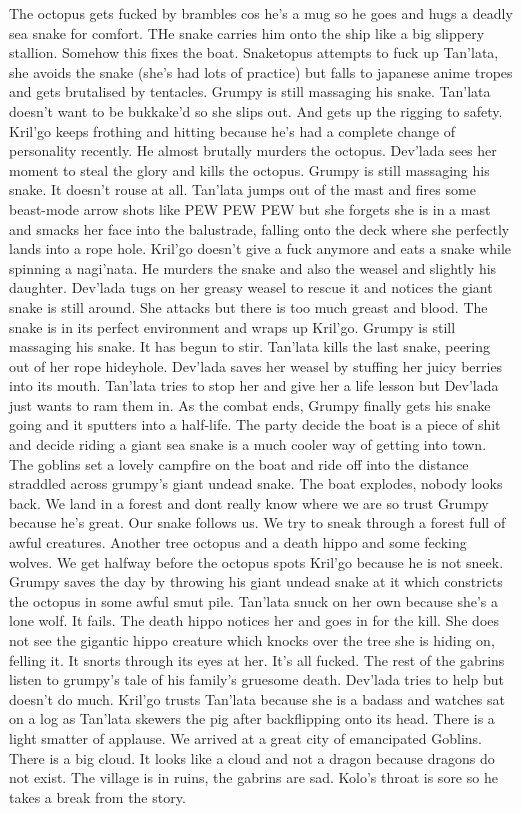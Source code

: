 The octopus gets fucked by brambles cos he’s a mug so he goes and hugs a deadly sea snake for comfort. THe snake carries him onto the ship like a big slippery stallion. Somehow this fixes the boat.\medskip
Snaketopus attempts to fuck up Tan’lata, she avoids the snake (she’s had lots of practice) but falls to japanese anime tropes and gets brutalised by tentacles.\medskip
Grumpy is still massaging his snake.\medskip
Tan’lata doesn’t want to be bukkake’d so she slips out. And gets up the rigging to safety.\medskip
Kril’go keeps frothing and hitting because he’s had a complete change of personality recently. He almost brutally murders the octopus. Dev’lada sees her moment to steal the glory and kills the octopus.\medskip
Grumpy is still massaging his snake. It doesn’t rouse at all.\medskip
Tan’lata jumps out of the mast and fires some beast-mode arrow shots like PEW PEW PEW but she forgets she is in a mast and smacks her face into the balustrade, falling onto the deck where she perfectly lands into a rope hole.\medskip
Kril’go doesn’t give a fuck anymore and eats a snake while spinning a nagi’nata. He murders the snake and also the weasel and slightly his daughter.\medskip
Dev’lada tugs on her greasy weasel to rescue it and notices the giant snake is still around. She attacks but there is too much greast and blood. The snake is in its perfect environment and wraps up Kril’go. Grumpy is still massaging his snake. It has begun to stir.\medskip
Tan’lata kills the last snake, peering out of her rope hideyhole.\medskip
Dev’lada saves her weasel by stuffing her juicy berries into its mouth. Tan’lata tries to stop her and give her a life lesson but Dev’lada just wants to ram them in.\medskip
As the combat ends, Grumpy finally gets his snake going and it sputters into a half-life. The party decide the boat is a piece of shit and decide riding a giant sea snake is a much cooler way of getting into town.\medskip
The goblins set a lovely campfire on the boat and ride off into the distance straddled across grumpy’s giant undead snake.\medskip
The boat explodes, nobody looks back.\medskip
We land in a forest and dont really know where we are so trust Grumpy because he’s great. Our snake follows us.\medskip
We try to sneak through a forest full of awful creatures. Another tree octopus and a death hippo and some fecking wolves. We get halfway before the octopus spots Kril’go because he is not sneek. Grumpy saves the day by throwing his giant undead snake at it which constricts the octopus in some awful smut pile.\medskip
Tan’lata snuck on her own because she’s a lone wolf. It fails. The death hippo notices her and goes in for the kill. She does not see the gigantic hippo creature which knocks over the tree she is hiding on, felling it. It snorts through its eyes at her. It’s all fucked.\medskip
The rest of the gabrins listen to grumpy’s tale of his family’s gruesome death.\medskip
Dev’lada tries to help but doesn’t do much. Kril’go trusts Tan’lata because she is a badass and watches sat on a log as Tan’lata skewers the pig after backflipping onto its head. There is a light smatter of applause.\medskip
We arrived at a great city of emancipated Goblins. There is a big cloud. It looks like a cloud and not a dragon because dragons do not exist. The village is in ruins, the gabrins are sad. Kolo’s throat is sore so he takes a break from the story.
